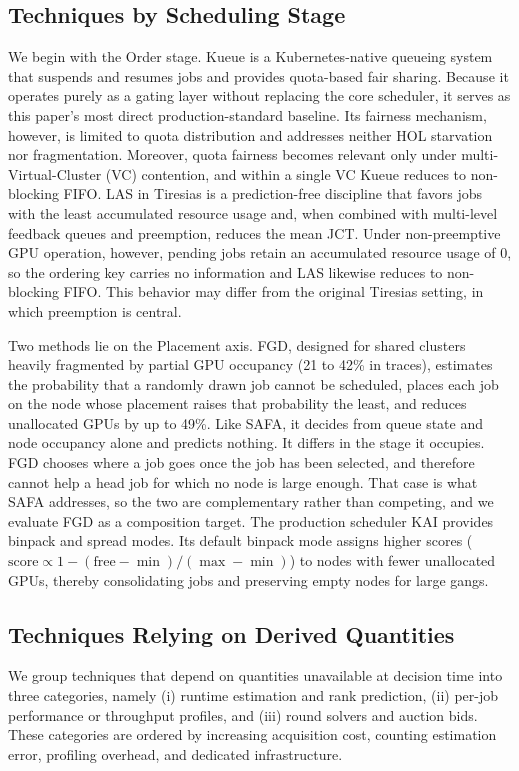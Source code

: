 \documentclass{ieeetj}
\begin{document}
\subsection{Techniques by Scheduling Stage}
We begin with the Order stage. Kueue\cite{kueue2024} is a Kubernetes-native queueing system that suspends and resumes jobs and provides quota-based fair sharing. Because it operates purely as a gating layer without replacing the core scheduler, it serves as this paper's most direct production-standard baseline. Its fairness mechanism, however, is limited to quota distribution and addresses neither HOL starvation nor fragmentation. Moreover, quota fairness becomes relevant only under multi-Virtual-Cluster (VC) contention, and within a single VC Kueue reduces to non-blocking FIFO. LAS in Tiresias\cite{gu2019tiresias} is a prediction-free discipline that favors jobs with the least accumulated resource usage and, when combined with multi-level feedback queues and preemption, reduces the mean JCT. Under non-preemptive GPU operation, however, pending jobs retain an accumulated resource usage of 0, so the ordering key carries no information and LAS likewise reduces to non-blocking FIFO. This behavior may differ from the original Tiresias setting, in which preemption is central.

Two methods lie on the Placement axis. FGD\cite{weng2023beware}, designed for shared clusters heavily fragmented by partial GPU occupancy (21 to 42\% in traces), estimates the probability that a randomly drawn job cannot be scheduled, places each job on the node whose placement raises that probability the least, and reduces unallocated GPUs by up to 49\%. Like SAFA, it decides from queue state and node occupancy alone and predicts nothing. It differs in the stage it occupies. FGD chooses where a job goes once the job has been selected, and therefore cannot help a head job for which no node is large enough. That case is what SAFA addresses, so the two are complementary rather than competing, and we evaluate FGD as a composition target. The production scheduler KAI\cite{kai2025} provides binpack and spread modes. Its default binpack mode assigns higher scores ($\text{score}\propto 1-(\text{free}-\min)/(\max-\min)$) to nodes with fewer unallocated GPUs, thereby consolidating jobs and preserving empty nodes for large gangs.

\subsection{Techniques Relying on Derived Quantities}
We group techniques that depend on quantities unavailable at decision time into three categories, namely (i) runtime estimation and rank prediction, (ii) per-job performance or throughput profiles, and (iii) round solvers and auction bids. These categories are ordered by increasing acquisition cost, counting estimation error, profiling overhead, and dedicated infrastructure.
\end{document}
